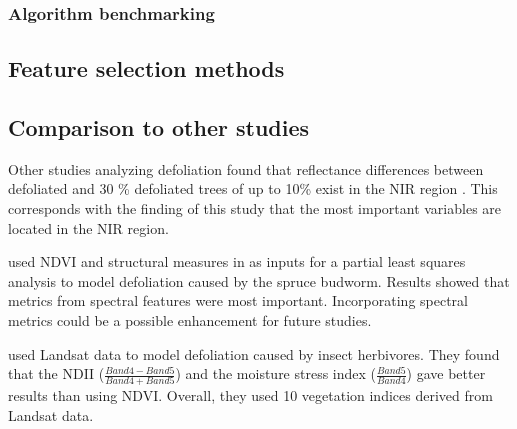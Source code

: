 \documentclass[review]{elsarticle}
\begin{document}
\subsubsection{Algorithm benchmarking}

\subsection{Feature selection methods}

\subsection{Comparison to other studies}

\noindent Other studies analyzing defoliation found that reflectance differences between defoliated and 30 \% defoliated trees of up to 10\% exist in the \ac{NIR} region \citep{rengara2016}.
This corresponds with the finding of this study that the most important variables are located in the NIR region.

\cite{goodbody2018} used NDVI and structural measures in as inputs for a partial least squares analysis to model defoliation caused by the spruce budworm.
Results showed that metrics from spectral features were most important.
Incorporating spectral metrics could be a possible enhancement for future studies.

\cite{townsend2012} used Landsat data to model defoliation caused by insect herbivores.
They found that the \ac{NDII} ($\frac{Band 4 - Band 5}{Band 4 + Band 5}$) and the moisture stress index ($\frac{Band 5}{Band 4}$) gave better results than using NDVI.
Overall, they used 10 vegetation indices derived from Landsat data.


\end{document}
